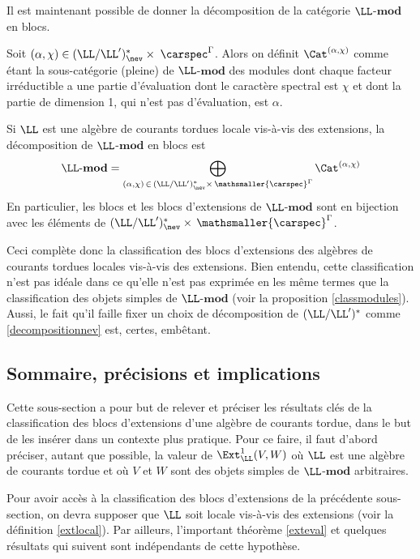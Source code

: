 Il est maintenant possible de donner la décomposition de la catégorie $\LL$-$\mathbf{mod}$ en blocs.

\begin{Def} Soit $(\alpha,\chi) \in (\LL/\LL')_{\nev}^* \times \; \carspec^\Gamma$. Alors on définit $\Cat^{(\alpha,\chi)}$ comme étant la sous-catégorie (pleine) de $\LL$-$\mathbf{mod}$ des modules dont chaque facteur irréductible a une partie d'évaluation dont le caractère spectral est $\chi$ et dont la partie de dimension 1, qui n'est pas d'évaluation, est $\alpha$.
\end{Def}

\begin{Cor} \label{bloc} Si $\LL$ est une algèbre de courants tordues locale vis-à-vis des extensions, la décomposition de $\LL$-$\mathbf{mod}$ en blocs est
$$ \text{$\LL$-$\mathbf{mod}$} = \bigoplus_{(\alpha,\chi) \,\in\, (\LL/\LL')_{\nev}^*\times \, \mathsmaller{\carspec}^\Gamma} \Cat^{(\alpha,\chi)} $$
En particulier, les blocs et les blocs d'extensions de $\LL$-$\mathbf{mod}$ sont en bijection avec les éléments de $(\LL/\LL')_{\nev}^*\times \, \mathsmaller{\carspec}^\Gamma$.
\end{Cor}

\begin{Rem} Ceci complète donc la classification des blocs d'extensions des algèbres de courants tordues locales vis-à-vis des extensions. Bien entendu, cette classification n'est pas idéale dans ce qu'elle n'est pas exprimée en les même termes que la classification des objets simples de $\LL$-$\mathbf{mod}$ (voir la proposition \ref{classmodules}). Aussi, le fait qu'il faille fixer un choix de décomposition de $(\LL/\LL')^*$ comme \ref{decompositionnev} est, certes, embêtant.
\end{Rem}

%
\subsection{Sommaire, précisions et implications}

Cette sous-section a pour but de relever et préciser les résultats clés de la classification des blocs d'extensions d'une algèbre de courants tordue, dans le but de les insérer dans un contexte plus pratique. Pour ce faire, il faut d'abord préciser, autant que possible, la valeur de $\Ext_\LL^1(V,W)$ où $\LL$ est une algèbre de courants tordue et où $V$ et $W$ sont des objets simples de $\LL$-$\mathbf{mod}$ arbitraires. 

\begin{Rem} Pour avoir accès à la classification des blocs d'extensions de la précédente sous-section, on devra supposer que  $\LL$ soit locale vis-à-vis des extensions (voir la définition \ref{extlocal}). Par ailleurs, l'important théorème \ref{exteval} et quelques résultats qui suivent sont indépendants de cette hypothèse.
\end{Rem}

